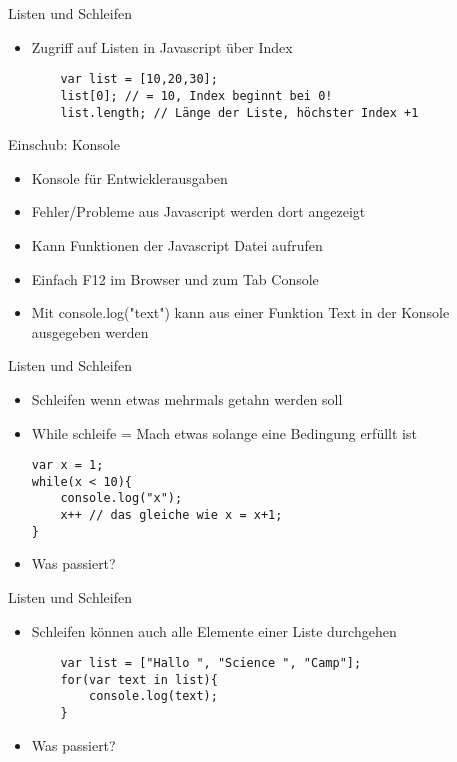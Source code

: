 \documentclass[18pt]{beamer}
\begin{document}
\begin{frame}[fragile]{Listen und Schleifen}
\begin{itemize}
	\item Zugriff auf Listen in Javascript über Index
	\begin{lstlisting}
	var list = [10,20,30];
	list[0]; // = 10, Index beginnt bei 0!
	list.length; // Länge der Liste, höchster Index +1 
	\end{lstlisting}
\end{itemize}
\end{frame}

\begin{frame}[fragile]{Einschub: Konsole}
\begin{itemize}
	\item Konsole für Entwicklerausgaben
	\item Fehler/Probleme aus Javascript werden dort angezeigt
	\item Kann Funktionen der Javascript Datei aufrufen
	\item Einfach F12 im Browser und zum Tab \glqq Console\grqq
	\item Mit console.log("text") kann aus einer Funktion Text in der Konsole ausgegeben werden
\end{itemize}
\end{frame}


\begin{frame}[fragile]{Listen und Schleifen}
\begin{itemize}
\item Schleifen wenn etwas mehrmals getahn werden soll
\item While schleife = \glqq Mach etwas solange eine Bedingung erfüllt ist\grqq
\begin{lstlisting}
var x = 1;
while(x < 10){
	console.log("x");
	x++ // das gleiche wie x = x+1;
}
\end{lstlisting}
\item Was passiert? 
\end{itemize}
\end{frame}

\begin{frame}[fragile]{Listen und Schleifen}
\begin{itemize}
	\item Schleifen können auch alle Elemente einer Liste durchgehen
	\begin{lstlisting}
	var list = ["Hallo ", "Science ", "Camp"];
	for(var text in list){
		console.log(text);
	}
	\end{lstlisting}
	\item Was passiert? 
\end{itemize}
\end{frame}
\end{document}
